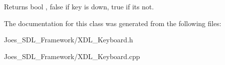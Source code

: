 \begin{DoxyReturn}{Returns}
bool , false if key is down, true if its not. 
\end{DoxyReturn}


The documentation for this class was generated from the following files\-:\begin{DoxyCompactItemize}
\item 
Joes\-\_\-\-S\-D\-L\-\_\-\-Framework/X\-D\-L\-\_\-\-Keyboard.\-h\item 
Joes\-\_\-\-S\-D\-L\-\_\-\-Framework/X\-D\-L\-\_\-\-Keyboard.\-cpp\end{DoxyCompactItemize}
